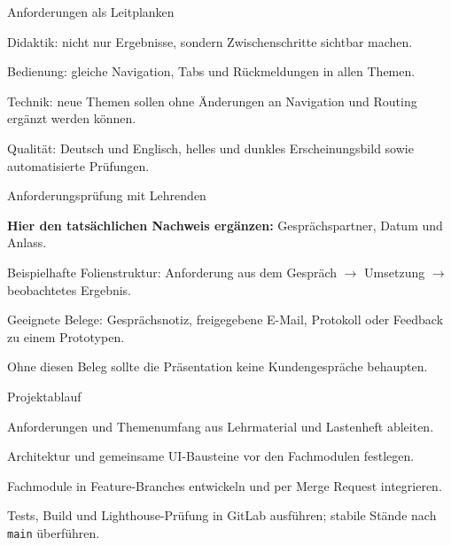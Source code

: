 
\begin{itemframe}{Anforderungen als Leitplanken}
  \item Didaktik: nicht nur Ergebnisse, sondern Zwischenschritte sichtbar machen.
  \item Bedienung: gleiche Navigation, Tabs und Rückmeldungen in allen Themen.
  \item Technik: neue Themen sollen ohne Änderungen an Navigation und Routing ergänzt werden können.
  \item Qualität: Deutsch und Englisch, helles und dunkles Erscheinungsbild sowie automatisierte Prüfungen.
\end{itemframe}

\begin{itemframe}{Anforderungsprüfung mit Lehrenden}
  \item \textbf{Hier den tatsächlichen Nachweis ergänzen:} Gesprächspartner, Datum und Anlass.
  \item Beispielhafte Folienstruktur: Anforderung aus dem Gespräch \(\rightarrow\) Umsetzung \(\rightarrow\) beobachtetes Ergebnis.
  \item Geeignete Belege: Gesprächsnotiz, freigegebene E-Mail, Protokoll oder Feedback zu einem Prototypen.
  \item Ohne diesen Beleg sollte die Präsentation keine Kundengespräche behaupten.
\end{itemframe}

\begin{itemframe}{Projektablauf}
  \item Anforderungen und Themenumfang aus Lehrmaterial und Lastenheft ableiten.
  \item Architektur und gemeinsame UI-Bausteine vor den Fachmodulen festlegen.
  \item Fachmodule in Feature-Branches entwickeln und per Merge Request integrieren.
  \item Tests, Build und Lighthouse-Prüfung in GitLab ausführen; stabile Stände nach \texttt{main} überführen.
\end{itemframe}
